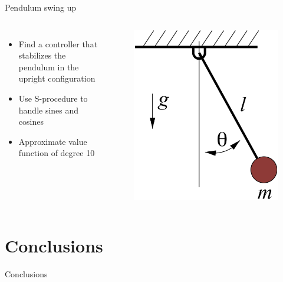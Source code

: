 \documentclass[aspectratio=169]{beamer}
\begin{document}
\begin{frame}{Pendulum swing up
\href{https://colab.research.google.com/github/TobiaMarcucci/optimal_control_pisa/blob/master/demos/pendulum_swing_up.ipynb}{}}
\begin{columns}
	\begin{itemize}
		\item
		Find a controller that stabilizes the pendulum in the upright configuration
		\item
		Use S-procedure to handle sines and cosines
		\item
		Approximate value function of degree 10
	\end{itemize}
	\begin{figure}
		\includegraphics[width=\columnwidth]{figures/simple_pend.png}
	\end{figure}
\end{columns}
\end{frame}

\section{Conclusions}
\begin{frame}
	\huge
	\centering
	{\color{darkred} Conclusions}
\end{frame}
\end{document}
